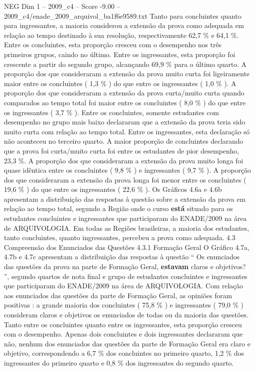 \begin{textsample}{NEG Dim 1 – 2009\_c4 – Score -9.00 – 2009\_c4/enade\_2009\_arquivol\_ba1f6e9589.txt}
Tanto para concluintes quanto para ingressantes, a maioria considerou a extensão da prova como adequada em relação ao tempo destinado à sua resolução, respectivamente 62,7 \% e 64,1 \%.
Entre os concluintes, esta proporção cresceu com o desempenho nos três primeiros grupos, caindo no último.
Entre os ingressantes, esta proporção foi crescente a partir do segundo grupo, alcançando 69,9 \% para o último quarto.
A proporção dos que consideraram a extensão da prova muito curta foi ligeiramente maior entre os concluintes ( 1,3 \% ) do que entre os ingressantes ( 1,0 \% ).
A proporção dos que consideraram a extensão da prova curta/muito curta quando comparados ao tempo total foi maior entre os concluintes ( 8,0 \% ) do que entre os ingressantes ( 3,7 \% ).
Entre os concluintes, somente estudantes com desempenho no grupo mais baixo declararam que a extensão da prova teria sido muito curta com relação ao tempo total.
Entre os ingressantes, esta declaração só não aconteceu no terceiro quarto.
A maior proporção de concluintes declarando que a prova foi curta/muito curta foi entre os estudantes de pior desempenho, 23,3 \%.
A proporção dos que consideraram a extensão da prova muito longa foi quase idêntica entre os concluintes ( 9,8 \% ) e ingressantes ( 9,7 \% ).
A proporção dos que consideraram a extensão da prova longa foi menor entre os concluintes ( 19,6 \% ) do que entre os ingressantes ( 22,6 \% ).
Os Gráficos 4.6a e 4.6b apresentam a distribuição das respostas à questão sobre a extensão da prova em relação ao tempo total, segundo a Região onde o curso \textbf{está} situado para os estudantes concluintes e ingressantes que participaram do ENADE/2009 na área de ARQUIVOLOGIA.
Em todas as Regiões brasileiras, a maioria dos estudantes, tanto concluintes, quanto ingressantes, percebeu a prova como adequada. 4.3 Compreensão dos Enunciados das Questões 4.3.1 Formação Geral O Gráfico 4.7a, 4.7b e 4.7c apresentam a distribuição das respostas à questão “ Os enunciados das questões da prova na parte de Formação Geral, \textbf{estavam} claros e objetivos? ”, segundo quartos de nota final e grupo de estudantes concluintes e ingressantes que participaram do ENADE/2009 na área de ARQUIVOLOGIA.
Com relação aos enunciados das questões da parte de Formação Geral, as opiniões foram positivas : a grande maioria dos concluintes ( 75,8 \% ) e ingressantes ( 79,0 \% ) consideram claros e objetivos os enunciados de todas ou da maioria das questões.
Tanto entre os concluintes quanto entre os ingressantes, esta proporção cresceu com o desempenho.
Apenas dois concluintes e dois ingressantes declararam que não, nenhum dos enunciados das questões da parte de Formação Geral era claro e objetivo, correspondendo a 6,7 \% dos concluintes no primeiro quarto, 1,2 \% dos ingressantes do primeiro quarto e 0,8 \% dos ingressantes do segundo quarto.

\end{textsample}
